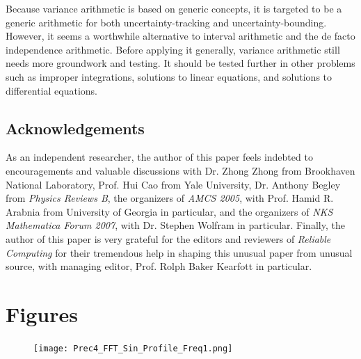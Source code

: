 \documentclass[twoside]{article}
\numberwithin{equation}{section}
\begin{document}
Because variance arithmetic is based on generic concepts, it is targeted to be a generic arithmetic for both uncertainty-tracking and uncertainty-bounding.  However, it seems a worthwhile alternative to interval arithmetic and the de facto independence arithmetic.  Before applying it generally, variance arithmetic still needs more groundwork and testing.  It should be tested further in other problems such as improper integrations, solutions to linear equations, and solutions to differential equations.    


\subsection{Acknowledgements}

As an independent researcher, the author of this paper feels indebted to encouragements and valuable discussions with Dr. Zhong Zhong from Brookhaven National Laboratory, Prof. Hui Cao from Yale University, Dr. Anthony Begley from \emph{Physics Reviews B}, the organizers of \emph{AMCS 2005}, with Prof. Hamid R. Arabnia from University of Georgia in particular, and the organizers of \emph{NKS Mathematica Forum 2007}, with Dr. Stephen Wolfram in particular. Finally, the author of this paper is very grateful for the editors and reviewers of \emph{Reliable Computing} for their tremendous help in shaping this unusual paper from unusual source, with managing editor, Prof. Rolph Baker Kearfott in particular.









\section{Figures}



\clearpage

\begin{figure}[p]
\centering
\texttt{[image: Prec4\_FFT\_Sin\_Profile\_Freq1.png]} 
\label{fig: Prec4_FFT_Sin_Profile_Freq1}
\end{figure}
\end{document}
